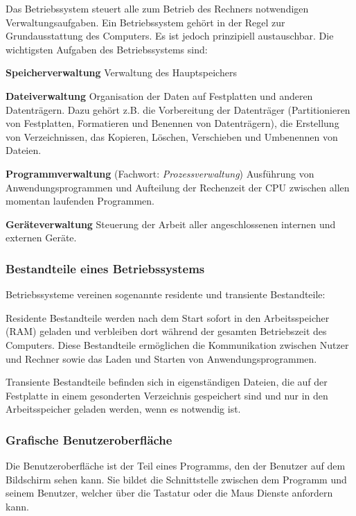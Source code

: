 Das Betriebssystem steuert alle zum Betrieb des Rechners notwendigen
Verwaltungsaufgaben. Ein Betriebssystem gehört in der Regel zur
Grundausstattung des Computers. Es ist jedoch prinzipiell austauschbar. Die
wichtigsten Aufgaben des Betriebssystems sind:

\begin{compactitem}
\item[\textbf{Speicherverwaltung}]
Verwaltung des Hauptspeichers
\item[\textbf{Dateiverwaltung}]
Organisation der Daten auf Festplatten und anderen Datenträgern. Dazu gehört z.B. die
Vorbereitung der Datenträger (Partitionieren von Festplatten, Formatieren und Benennen von
Datenträgern), die Erstellung von Verzeichnissen, das Kopieren, Löschen, Verschieben und
Umbenennen von Dateien.
\item[\textbf{Programmverwaltung} (Fachwort: \emph{Prozessverwaltung})]
Ausführung von Anwendungsprogrammen und Aufteilung der Rechenzeit der CPU zwischen allen
momentan laufenden Programmen.
\item[\textbf{Geräteverwaltung}]
Steuerung der Arbeit aller angeschlossenen internen und externen Geräte.
\end{compactitem}

\subsubsection{Bestandteile eines Betriebssystems}

Betriebssysteme vereinen sogenannte residente und transiente Bestandteile:

Residente Bestandteile werden nach dem Start sofort in den Arbeitsspeicher
(RAM) geladen und verbleiben dort während der gesamten Betriebszeit des
Computers. Diese Bestandteile ermöglichen die Kommunikation zwischen Nutzer und
Rechner sowie das Laden und Starten von Anwendungsprogrammen.

Transiente Bestandteile befinden sich in eigenständigen Dateien, die auf der
Festplatte in einem gesonderten Verzeichnis gespeichert sind und nur in den
Arbeitsspeicher geladen werden, wenn es notwendig ist.

\subsubsection{Grafische Benutzeroberfläche}

Die Benutzeroberfläche ist der Teil eines Programms, den der Benutzer auf dem
Bildschirm sehen kann. Sie bildet die Schnittstelle zwischen dem Programm und
seinem Benutzer, welcher über die Tastatur oder die Maus Dienste anfordern
kann.

